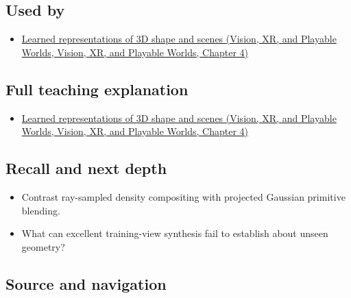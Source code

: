 \subsection{Used by}\label{appendix-c5b332e400e7-used-by}

\begin{itemize}
\tightlist
\item
  \href{../07-Vision-XR-and-Playable-Worlds/main.pdf\#nameddest=04-visual-computing-ii-ch034-learned-representations-of-3d-shape-and-scenes}{Learned representations of 3D shape and scenes (Vision, XR, and Playable Worlds, Vision, XR, and Playable Worlds, Chapter 4)}
\end{itemize}

\subsection{Full teaching explanation}\label{appendix-c5b332e400e7-full-teaching-explanation}

\begin{itemize}
\tightlist
\item
  \href{../07-Vision-XR-and-Playable-Worlds/main.pdf\#nameddest=04-visual-computing-ii-ch034-learned-representations-of-3d-shape-and-scenes}{Learned representations of 3D shape and scenes (Vision, XR, and Playable Worlds, Vision, XR, and Playable Worlds, Chapter 4)}
\end{itemize}

\subsection{Recall and next depth}\label{appendix-c5b332e400e7-recall-and-next-depth}

\begin{itemize}
\tightlist
\item
  Contrast ray-sampled density compositing with projected Gaussian primitive blending.
\item
  What can excellent training-view synthesis fail to establish about unseen geometry?
\end{itemize}

\subsection{Source and navigation}\label{appendix-c5b332e400e7-source-and-navigation}

